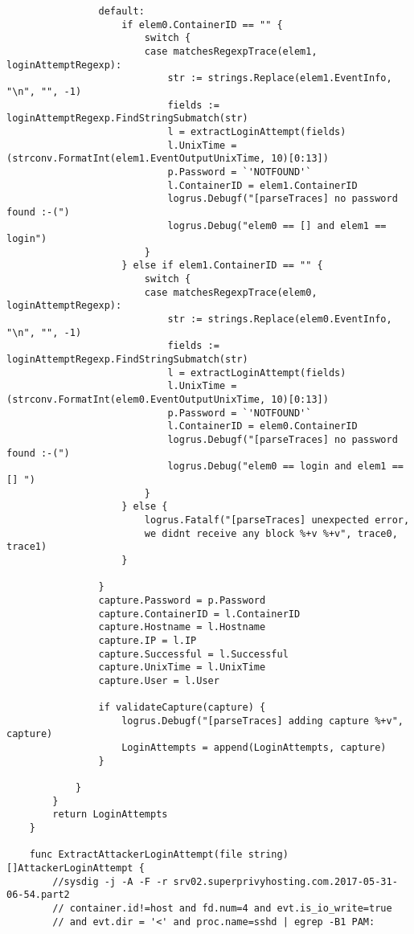 \begin{verbatim}
                default:
                    if elem0.ContainerID == "" {
                        switch {
                        case matchesRegexpTrace(elem1, loginAttemptRegexp):
                            str := strings.Replace(elem1.EventInfo, "\n", "", -1)
                            fields := loginAttemptRegexp.FindStringSubmatch(str)
                            l = extractLoginAttempt(fields)
                            l.UnixTime = (strconv.FormatInt(elem1.EventOutputUnixTime, 10)[0:13])
                            p.Password = `'NOTFOUND'`
                            l.ContainerID = elem1.ContainerID
                            logrus.Debugf("[parseTraces] no password found :-(")
                            logrus.Debug("elem0 == [] and elem1 == login")
                        }
                    } else if elem1.ContainerID == "" {
                        switch {
                        case matchesRegexpTrace(elem0, loginAttemptRegexp):
                            str := strings.Replace(elem0.EventInfo, "\n", "", -1)
                            fields := loginAttemptRegexp.FindStringSubmatch(str)
                            l = extractLoginAttempt(fields)
                            l.UnixTime = (strconv.FormatInt(elem0.EventOutputUnixTime, 10)[0:13])
                            p.Password = `'NOTFOUND'`
                            l.ContainerID = elem0.ContainerID
                            logrus.Debugf("[parseTraces] no password found :-(")
                            logrus.Debug("elem0 == login and elem1 == [] ")
                        }
                    } else {
                        logrus.Fatalf("[parseTraces] unexpected error, 
                        we didnt receive any block %+v %+v", trace0, trace1)
                    }
    
                }
                capture.Password = p.Password
                capture.ContainerID = l.ContainerID
                capture.Hostname = l.Hostname
                capture.IP = l.IP
                capture.Successful = l.Successful
                capture.UnixTime = l.UnixTime
                capture.User = l.User
    
                if validateCapture(capture) {
                    logrus.Debugf("[parseTraces] adding capture %+v", capture)
                    LoginAttempts = append(LoginAttempts, capture)
                }
    
            }
        }
        return LoginAttempts
    }
    
    func ExtractAttackerLoginAttempt(file string) []AttackerLoginAttempt {
        //sysdig -j -A -F -r srv02.superprivyhosting.com.2017-05-31-06-54.part2 
        // container.id!=host and fd.num=4 and evt.is_io_write=true 
        // and evt.dir = '<' and proc.name=sshd | egrep -B1 PAM:
    

\end{verbatim}

